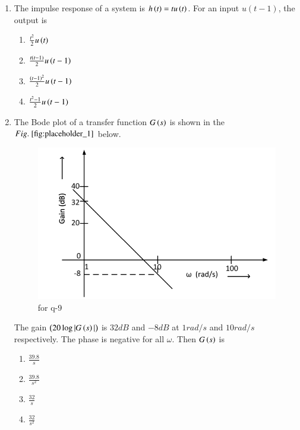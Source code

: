 \documentclass[journal,12pt,onecolumn]{IEEEtran}
\theoremstyle{remark}
\begin{document}
\begin{enumerate}
\item The impulse response of a system is $h\left(t\right)=t u\left(t\right)$. For an input $u(t-1)$, the output is
\begin{multicols}{4}
    \begin{enumerate}
        \item $\frac{t^{2}}{2}u\left(t\right)$
        \item $\frac{t\left(t-1\right)}{2}u\left(t-1\right)$
        \item $\frac{\left(t-1\right)^{2}}{2}u\left(t-1\right)$
        \item $\frac{t^{2}-1}{2}u\left(t-1\right)$
    \end{enumerate}
\end{multicols}
\hfill {}

\item The Bode plot of a transfer function $G\left(s\right)$ is shown in the $\figref{fig:placeholder_1}$ below.
\begin{figure}[H]
    \centering
    \includegraphics[width=0.5\columnwidth]{figs/fig_1.png}
    \caption{\centering for q-9}
    \label{fig:placeholder_1}
\end{figure}

The gain $\left(20 \log |G\left(s\right)|\right)$ is $32 dB$ and $-8 dB$ at $1 rad/s$ and $10 rad/s$ respectively. The phase is negative for all $\omega$. Then $G\left(s\right)$ is
\begin{multicols}{4}
    \begin{enumerate}
        \item $\frac{39.8}{s}$
        \item $\frac{39.8}{s^2}$
        \item $\frac{32}{s}$
        \item $\frac{32}{s^2}$
    \end{enumerate}
\end{multicols}
\hfill {}


\end{enumerate}
\end{document}
